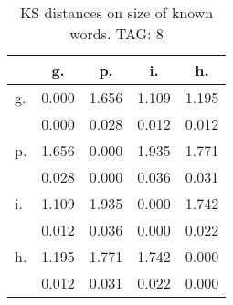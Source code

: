 \begin{table}[h!]
\begin{center}
\begin{tabular}{| l | c | c | c | c |}\hline
 & g. & p. & i. & h. \\\hline
g. & 0.000  & 1.656  & 1.109  & 1.195 \\\hline
 & 0.000  & 0.028  & 0.012  & 0.012 \\\hline
p. & 1.656  & 0.000  & 1.935  & 1.771 \\\hline
 & 0.028  & 0.000  & 0.036  & 0.031 \\\hline
i. & 1.109  & 1.935  & 0.000  & 1.742 \\\hline
 & 0.012  & 0.036  & 0.000  & 0.022 \\\hline
h. & 1.195  & 1.771  & 1.742  & 0.000 \\\hline
 & 0.012  & 0.031  & 0.022  & 0.000 \\\hline
\end{tabular}
\caption{KS distances on size of known words. TAG: 8}
\end{center}
\end{table}